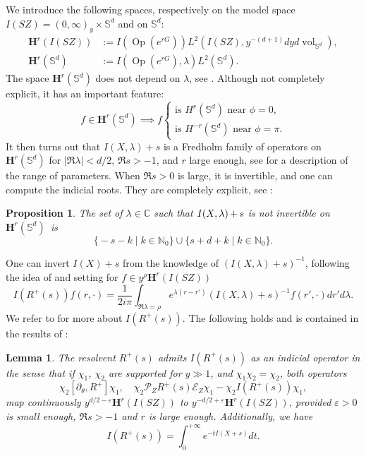 \documentclass[JEP,XML,SOM,Unicode,NoFloatCountersInSection]{cedram}
\newcommand{\bH}{\boldsymbol{H}}
\newcommand{\C}{\mathbb{C}}
\newcommand{\N}{\mathbb{N}}
\newcommand{\Ss}{\mathbb{S}}
\newcommand{\eps}{\varepsilon}
\newcommand{\ZZ}{I(SZ)}
\DeclareMathOperator{\vol}{\mathrm{vol}}
\DeclareMathOperator{\Op}{Op}
\theoremstyle{plain}
\newtheorem{lemma}{Lemma}[section]
\newtheorem{proposition}{Proposition}[section]
\theoremstyle{definition}
\begin{document}
We introduce the following spaces, respectively on the model space $\ZZ=(0,\infty)_y\times\Ss^d$ and on $\Ss^d$:
\[
\begin{split}
\bH^{r}(\ZZ) &:= I(\Op(e^{rG}))L^2(\ZZ, y^{-(d+1)}dyd\vol_{\Ss^d}),\\
\bH^{r}(\Ss^d) &:= I(\Op(e^{rG}), \lambda) L^2(\Ss^d).
\end{split}
\]
The space $\bH^{r}(\Ss^d)$ does not depend on $\lambda$, see \cite[\S 3.3]{Bonthonneau-Weich-17}. Although not completely explicit, it has an important feature:
\[
f \in \bH^{r}(\Ss^d) \implies f\begin{cases}
\text{is $H^{ r}(\Ss^d)$ near $\phi=0$},\\
\text{is $H^{- r}(\Ss^d)$ near $\phi=\pi$}.
\end{cases}
\]
It then turns out that $I(X,\lambda)+s$ is a Fredholm family of operators on $\bH^{r}(\Ss^d)$ for $|\Re \lambda| < d/2$, $\Re s> -1$, and $r$ large enough, see \cite[Lem.\,3.24]{Bonthonneau-Weich-17} for a description of the range of parameters. When $\Re s>0$ is large, it is invertible, and one can compute the indicial roots. They are completely explicit, see \cite[Prop.\,5.5 \& Lem.\,5.8]{Bonthonneau-Weich-17}:

\begin{proposition}
\label{prop:computation-indicial-residue}
The set of $\lambda \!\in\! \C$ such that $I(X,\lambda) \mkern-1mu+\mkern-1mu s$ is not invertible on $\bH^{r}\!(\Ss^d)$~is
\[
\bigl\{ - s-k \mid k \in \N_{ 0}\bigr\} \cup \bigl\{s+d+k \mid k \in \N_{ 0}\bigr\}.
\]
\end{proposition}

One can invert $I(X)+s$ from the knowledge of $(I(X,\lambda)+s)^{-1}$, following the idea of \cite[Prop.\,4.5]{Bonthonneau-Lefeuvre-19-1} and setting for $f\in y^\rho\bH^r(\ZZ)$
\[
I(R^+(s))f(r,\cdot)= \frac{1}{2i\pi}\int_{\Re \lambda = \rho} e^{\lambda(r-r')}(I(X,\lambda)+s)^{-1} f(r',\cdot) dr' d\lambda.
\]
We refer to \cite[Th.\,2]{Bonthonneau-Weich-17} for more about $I(R^+(s))$. The following holds and is contained in the results of \cite[Lem.\,4.16]{Bonthonneau-Weich-17}:

\begin{lemma}
\label{lemma:admits-indicial}
The resolvent $R^+(s)$ admits $I(R^+(s))$ as an indicial operator in the sense that if $\chi_1$, $\chi_2$ are supported for $y\gg 1$, and $\chi_1\chi_2= \chi_2$, both operators
\begin{equation}\label{eq:admits-indicial}
\chi_2 [\partial_\theta, R^+] \chi_1, \quad \chi_2\mathcal{P}_Z R^+(s) \mathcal{E}_Z \chi_1 - \chi_2 I(R^+(s)) \chi_1 ,
\end{equation}
map continuously $y^{d/2-\eps} \bH^r(\ZZ)$ to $y^{-d/2+\eps}\bH^r(\ZZ)$, provided $\eps > 0$ is small enough, $\Re s>-1$ and $r$ is large enough. Additionally, we have
\begin{equation}\label{eq:I(R+)}
I(R^+(s)) = \int_0^{+\infty} e^{- t I(X+s)} dt.
\end{equation}
\end{lemma}
\end{document}
